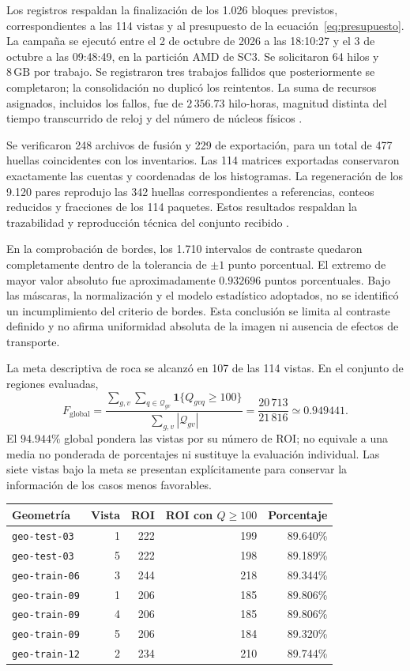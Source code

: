 \documentclass[11pt,a4paper]{article}
\newcommand{\ind}{\mathbf{1}}
\begin{document}
Los registros respaldan la finalización de los 1.026 bloques previstos, correspondientes a las 114 vistas y al presupuesto de la ecuación~\eqref{eq:presupuesto}. La campaña se ejecutó entre el 2 de octubre de 2026 a las 18:10:27 y el 3 de octubre a las 09:48:49, en la partición AMD de SC3. Se solicitaron 64 hilos y $8\,\mathrm{GB}$ por trabajo. Se registraron tres trabajos fallidos que posteriormente se completaron; la consolidación no duplicó los reintentos. La suma de recursos asignados, incluidos los fallos, fue de $2\,356.73$ hilo-horas, magnitud distinta del tiempo transcurrido de reloj y del número de núcleos físicos \cite{campana}.

Se verificaron 248 archivos de fusión y 229 de exportación, para un total de 477 huellas coincidentes con los inventarios. Las 114 matrices exportadas conservaron exactamente las cuentas y coordenadas de los histogramas. La regeneración de los 9.120 pares reprodujo las 342 huellas correspondientes a referencias, conteos reducidos y fracciones de los 114 paquetes. Estos resultados respaldan la trazabilidad y reproducción técnica del conjunto recibido \cite{datos}.

En la comprobación de bordes, los 1.710 intervalos de contraste quedaron completamente dentro de la tolerancia de $\pm1$ punto porcentual. El extremo de mayor valor absoluto fue aproximadamente $0.932696$ puntos porcentuales. Bajo las máscaras, la normalización y el modelo estadístico adoptados, no se identificó un incumplimiento del criterio de bordes. Esta conclusión se limita al contraste definido y no afirma uniformidad absoluta de la imagen ni ausencia de efectos de transporte.

La meta descriptiva de roca se alcanzó en 107 de las 114 vistas. En el conjunto de regiones evaluadas,
\begin{equation}
 F_{\mathrm{global}}=
 \frac{\sum_{g,v}\sum_{q\in\mathcal Q_{gv}}\ind\{Q_{gvq}\geq100\}}
 {\sum_{g,v}|\mathcal Q_{gv}|}
 =\frac{20\,713}{21\,816}\simeq0.949441.
\end{equation}
El $94.944\%$ global pondera las vistas por su número de ROI; no equivale a una media no ponderada de porcentajes ni sustituye la evaluación individual. Las siete vistas bajo la meta se presentan explícitamente para conservar la información de los casos menos favorables.

\begin{center}
\begin{tabular}{lrrrr}
\toprule Geometría & Vista & ROI & ROI con $Q\geq100$ & Porcentaje\\\midrule
\texttt{geo-test-03}&1&222&199&89.640\%\\
\texttt{geo-test-03}&5&222&198&89.189\%\\
\texttt{geo-train-06}&3&244&218&89.344\%\\
\texttt{geo-train-09}&1&206&185&89.806\%\\
\texttt{geo-train-09}&4&206&185&89.806\%\\
\texttt{geo-train-09}&5&206&184&89.320\%\\
\texttt{geo-train-12}&2&234&210&89.744\%\\\bottomrule
\end{tabular}
\end{center}
\end{document}
